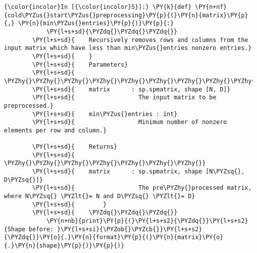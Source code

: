     \begin{Verbatim}[commandchars=\\\{\}]
{\color{incolor}In [{\color{incolor}5}]:} \PY{k}{def} \PY{n+nf}{cold\PYZus{}start\PYZus{}preprocessing}\PY{p}{(}\PY{n}{matrix}\PY{p}{,} \PY{n}{min\PYZus{}entries}\PY{p}{)}\PY{p}{:}
            \PY{l+s+sd}{\PYZdq{}\PYZdq{}\PYZdq{}}
        \PY{l+s+sd}{    Recursively removes rows and columns from the input matrix which have less than min\PYZus{}entries nonzero entries.}
        \PY{l+s+sd}{    }
        \PY{l+s+sd}{    Parameters}
        \PY{l+s+sd}{    \PYZhy{}\PYZhy{}\PYZhy{}\PYZhy{}\PYZhy{}\PYZhy{}\PYZhy{}\PYZhy{}\PYZhy{}\PYZhy{}}
        \PY{l+s+sd}{    matrix      : sp.spmatrix, shape [N, D]}
        \PY{l+s+sd}{                  The input matrix to be preprocessed.}
        \PY{l+s+sd}{    min\PYZus{}entries : int}
        \PY{l+s+sd}{                  Minimum number of nonzero elements per row and column.}
        
        \PY{l+s+sd}{    Returns}
        \PY{l+s+sd}{    \PYZhy{}\PYZhy{}\PYZhy{}\PYZhy{}\PYZhy{}\PYZhy{}\PYZhy{}}
        \PY{l+s+sd}{    matrix      : sp.spmatrix, shape [N\PYZsq{}, D\PYZsq{}]}
        \PY{l+s+sd}{                  The pre\PYZhy{}processed matrix, where N\PYZsq{} \PYZlt{}= N and D\PYZsq{} \PYZlt{}= D}
        \PY{l+s+sd}{        }
        \PY{l+s+sd}{    \PYZdq{}\PYZdq{}\PYZdq{}}
            \PY{n+nb}{print}\PY{p}{(}\PY{l+s+s2}{\PYZdq{}}\PY{l+s+s2}{Shape before: }\PY{l+s+si}{\PYZob{}\PYZcb{}}\PY{l+s+s2}{\PYZdq{}}\PY{o}{.}\PY{n}{format}\PY{p}{(}\PY{n}{matrix}\PY{o}{.}\PY{n}{shape}\PY{p}{)}\PY{p}{)}
            

\end{Verbatim}
